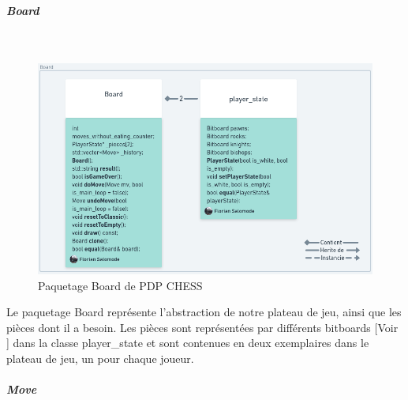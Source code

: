 \huge\documentclass{article}
\begin{document}
\subparagraph{Board}
~~\\
\newline
\begin{figure}[!h]
    \centering
    \includegraphics[scale = 0.4]{img/Package/Board.png}
    \caption{Paquetage Board de PDP CHESS}
    \label{pck:board}
\end{figure}

Le paquetage Board représente l'abstraction de notre plateau de jeu, ainsi que les pièces dont il a besoin.
Les pièces sont représentées par différents bitboards [Voir \cite{Bitboards}] dans la classe player\_state et sont contenues en deux exemplaires dans le plateau de jeu, un pour chaque joueur.
\newpage

\subparagraph{Move}
~~\\
\newline
\end{document}
